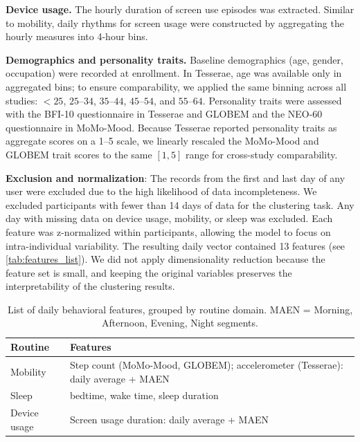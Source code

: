 \documentclass[pdflatex,sn-vancouver,Numbered]{bst/sn-jnl}%
\theoremstyle{thmstyleone}%
\theoremstyle{thmstyletwo}%
\theoremstyle{thmstylethree}%
\begin{document}
\textbf{Device usage.} The hourly duration of screen use episodes was extracted. Similar to mobility, daily rhythms for screen usage were constructed by aggregating the hourly measures into 4-hour bins. 

\textbf{Demographics and personality traits.} Baseline demographics (age, gender, occupation) were recorded at enrollment. In Tesserae, age was available only in aggregated bins; to ensure comparability, we applied the same binning across all studies: \(<\!25\), \(25\text{--}34\), \(35\text{--}44\), \(45\text{--}54\), and \(55\text{--}64\). Personality traits were assessed with the BFI-10 questionnaire \cite{rammstedt2007measuring} in Tesserae and GLOBEM and the NEO-60 questionnaire \cite{costa1992neo} in MoMo-Mood. Because Tesserae reported personality traits as aggregate scores on a 1–5 scale, we linearly rescaled the MoMo-Mood and GLOBEM trait scores to the same $[1,5]$ range for cross-study comparability.

\textbf{Exclusion and normalization}: The records from the first and last day of any user were excluded due to the high likelihood of data incompleteness. We excluded participants with fewer than 14 days of data for the clustering task. Any day with missing data on device usage, mobility, or sleep was excluded. Each feature was z-normalized within participants, allowing the model to focus on intra-individual variability. The resulting daily vector contained 13 features (see \autoref{tab:features_list}). We did not apply dimensionality reduction because the feature set is small, and keeping the original variables preserves the interpretability of the clustering results.

\begin{table}[ht]
    \centering
    \begin{tabular}{ll}
        \toprule
        \textbf{Routine} & \textbf{Features} \\
        \midrule
        Mobility & Step count (MoMo-Mood, GLOBEM); accelerometer (Tesserae): daily average + MAEN \\
        Sleep             & bedtime, wake time, sleep duration \\
        Device usage      & Screen usage duration: daily average + MAEN \\
        \bottomrule
    \end{tabular}
    \caption{List of daily behavioral features, grouped by routine domain. MAEN = Morning, Afternoon, Evening, Night segments.}
    \label{tab:features_list}
\end{table}
\end{document}
